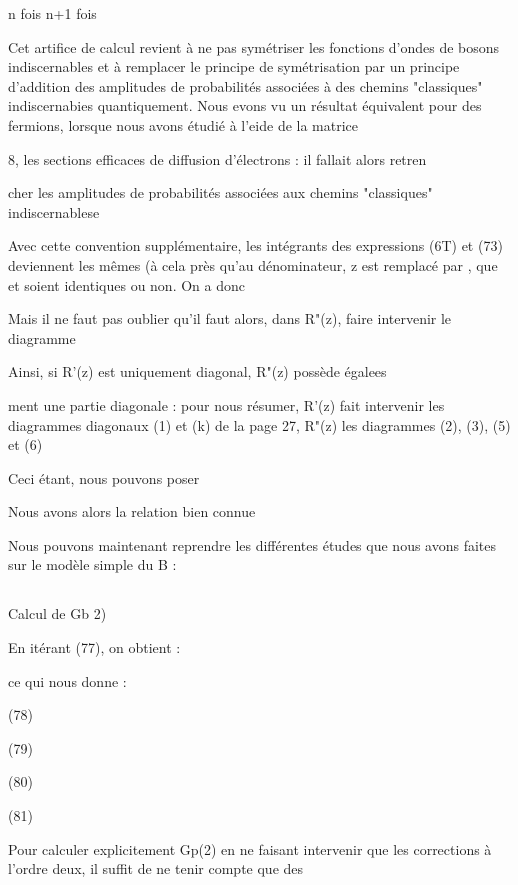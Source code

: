 n fois n+1 fois

Cet artifice de calcul revient à ne pas symétriser les fonctions
d'ondes de bosons indiscernables et à remplacer le principe de symétrisation
par un principe d'addition des amplitudes de probabilités associées à des
chemins "classiques" indiscernabies quantiquement. Nous evons vu un résultat
équivalent pour des fermions, lorsque nous avons étudié à l'eide de la matrice

8, les sections efficaces de diffusion d'électrons : il fallait alors retren

cher les amplitudes de probabilités associées aux chemins "classiques" indiscernablese

Avec cette convention supplémentaire, les intégrants des expressions
(6T) et (73) deviennent les mêmes (à cela près qu'au dénominateur, z est remplacé par , que  et  soient identiques ou non. On a donc

Mais il ne faut pas oublier qu'il faut alors, dans R"(z), faire
intervenir le diagramme

Ainsi, si R'(z) est uniquement diagonal, R"(z) possède égalees

ment une partie diagonale : pour nous résumer, R'(z) fait intervenir les
diagrammes diagonaux (1) et (k) de la page 27, R"(z) les diagrammes (2),
(3), (5) et (6)

Ceci étant, nous pouvons poser

Nous avons alors la relation bien connue

Nous pouvons maintenant reprendre les différentes études que
nous avons faites sur le modèle simple du  B :

\subsection{}%

\subsubsection{} Calcul de Gb 2)%

En itérant (77), on obtient :

ce qui nous donne :

(78)

(79)

(80)

(81)



Pour calculer explicitement Gp(2) en ne faisant intervenir
que les corrections à l'ordre deux, il suffit de ne tenir compte que des

